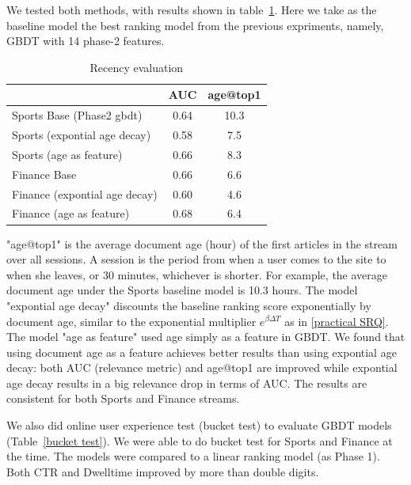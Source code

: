  We tested both methods, with results shown in table~\ref{recency}. Here we 
 take as 
 the baseline model the best ranking model from the previous expriments, 
 namely, GBDT with 14 phase-2 features.

\begin{table} 
\caption{ Recency evaluation }\label{recency}
\begin{tabular}{|p{50mm}|c|c|}\hline
     & AUC & age@top1 \\ \hline
Sports Base (Phase2 gbdt) &  0.64 & 10.3  \\ \hline
Sports (expontial age decay) & 0.58 & 7.5 \\ \hline
Sports (age as feature) & 0.66  & 8.3 \\ \hline \hline
Finance Base & 0.66 & 6.6 \\ \hline
Finance (expontial age decay) & 0.60 & 4.6 \\ \hline
Finance (age as feature)  & 0.68 & 6.4 \\ \hline
\end{tabular}

\end{table}

"age@top1" is the average document age (hour) of the first articles in the 
stream over all sessions. A session is the period from when a user comes to 
the site to when she leaves, or 30 minutes, whichever is shorter. 
For example, the average document age under the Sports baseline model is 10.3 
hours. The model "expontial age decay" discounts the baseline ranking score 
exponentially by document age, similar to the exponential multiplier $e^{\beta 
\Delta T}$ as in \eqref{practical SRQ}. The model "age as feature" used 
age simply as a feature in GBDT. 
We found that using document age as a feature achieves better results than 
using expontial age decay: both AUC (relevance metric) and age@top1 are 
improved while expontial age decay results in a big relevance drop in terms of 
AUC.
The results are consistent for both Sports and Finance streams. 


We also did online user experience test (bucket test) to evaluate GBDT models 
(Table~\ref{bucket test}). We were able to do bucket test for Sports and 
Finance at the time. The models were compared to a linear ranking model (as 
Phase 1). Both CTR and Dwelltime improved by more than double digits. 

